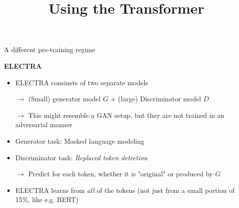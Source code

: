 



\newcommand{\titlefigure}{figure/sesamestreet.jpeg}
\newcommand{\learninggoals}{
\item Replaced Token Detection task
\item Interplay of Generator and Discriminator}

\title{Using the Transformer}
\date{}




\begin{frame}{A different pre-training regime}

\vfill

	\textbf{ELECTRA \href{https://arxiv.org/pdf/2003.10555.pdf}{}}

	\begin{itemize}
		\item ELECTRA consinsts of two separate models
		\item[$\to$] (Small) generator model $G$ + (large) Discriminator model $D$
		\item[$\to$] This might resemble a GAN setup, but they are not trained in an adversarial manner
		\item Generator task: Masked language modeling
		\item Discriminator task: \textit{Replaced token detection}
		\item[$\to$] Predict for each token, whether it is "original" or produced by $G$
		\item ELECTRA learns from \textit{all} of the tokens (not just from a small portion of 15\%, like e.g. BERT)
	\end{itemize}
	
\vfill

\end{frame}


